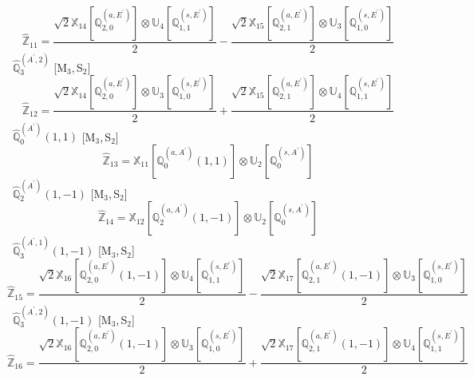 \documentclass[fleqn,10pt,landscape]{article}
\begin{document}
\begin{itemize}
\begin{dmath*}
\hat{\mathbb{Z}}_{11}=\frac{\sqrt{2} \mathbb{X}_{14}[\mathbb{Q}_{2,0}^{(a,E^{\prime})}] \otimes\mathbb{U}_{4}[\mathbb{Q}_{1,1}^{(s,E^{\prime})}]}{2} - \frac{\sqrt{2} \mathbb{X}_{15}[\mathbb{Q}_{2,1}^{(a,E^{\prime})}] \otimes\mathbb{U}_{3}[\mathbb{Q}_{1,0}^{(s,E^{\prime})}]}{2}
\end{dmath*}
\vspace{4mm}
\noindent {} $\,\,\,\hat{\mathbb{Q}}_{3}^{(A^{\prime},2)}$ [M$_{3}$,\,S$_{2}$]
\begin{dmath*}
\hat{\mathbb{Z}}_{12}=\frac{\sqrt{2} \mathbb{X}_{14}[\mathbb{Q}_{2,0}^{(a,E^{\prime})}] \otimes\mathbb{U}_{3}[\mathbb{Q}_{1,0}^{(s,E^{\prime})}]}{2} + \frac{\sqrt{2} \mathbb{X}_{15}[\mathbb{Q}_{2,1}^{(a,E^{\prime})}] \otimes\mathbb{U}_{4}[\mathbb{Q}_{1,1}^{(s,E^{\prime})}]}{2}
\end{dmath*}
\vspace{4mm}
\noindent {} $\,\,\,\hat{\mathbb{Q}}_{0}^{(A^{\prime})}(1,1)$ [M$_{3}$,\,S$_{2}$]
\begin{dmath*}
\hat{\mathbb{Z}}_{13}=\mathbb{X}_{11}[\mathbb{Q}_{0}^{(a,A^{\prime})}(1,1)] \otimes\mathbb{U}_{2}[\mathbb{Q}_{0}^{(s,A^{\prime})}]
\end{dmath*}
\vspace{4mm}
\noindent {} $\,\,\,\hat{\mathbb{Q}}_{2}^{(A^{\prime})}(1,-1)$ [M$_{3}$,\,S$_{2}$]
\begin{dmath*}
\hat{\mathbb{Z}}_{14}=\mathbb{X}_{12}[\mathbb{Q}_{2}^{(a,A^{\prime})}(1,-1)] \otimes\mathbb{U}_{2}[\mathbb{Q}_{0}^{(s,A^{\prime})}]
\end{dmath*}
\vspace{4mm}
\noindent {} $\,\,\,\hat{\mathbb{Q}}_{3}^{(A^{\prime},1)}(1,-1)$ [M$_{3}$,\,S$_{2}$]
\begin{dmath*}
\hat{\mathbb{Z}}_{15}=\frac{\sqrt{2} \mathbb{X}_{16}[\mathbb{Q}_{2,0}^{(a,E^{\prime})}(1,-1)] \otimes\mathbb{U}_{4}[\mathbb{Q}_{1,1}^{(s,E^{\prime})}]}{2} - \frac{\sqrt{2} \mathbb{X}_{17}[\mathbb{Q}_{2,1}^{(a,E^{\prime})}(1,-1)] \otimes\mathbb{U}_{3}[\mathbb{Q}_{1,0}^{(s,E^{\prime})}]}{2}
\end{dmath*}
\vspace{4mm}
\noindent {} $\,\,\,\hat{\mathbb{Q}}_{3}^{(A^{\prime},2)}(1,-1)$ [M$_{3}$,\,S$_{2}$]
\begin{dmath*}
\hat{\mathbb{Z}}_{16}=\frac{\sqrt{2} \mathbb{X}_{16}[\mathbb{Q}_{2,0}^{(a,E^{\prime})}(1,-1)] \otimes\mathbb{U}_{3}[\mathbb{Q}_{1,0}^{(s,E^{\prime})}]}{2} + \frac{\sqrt{2} \mathbb{X}_{17}[\mathbb{Q}_{2,1}^{(a,E^{\prime})}(1,-1)] \otimes\mathbb{U}_{4}[\mathbb{Q}_{1,1}^{(s,E^{\prime})}]}{2}

\end{dmath*}
\end{itemize}
\end{document}
